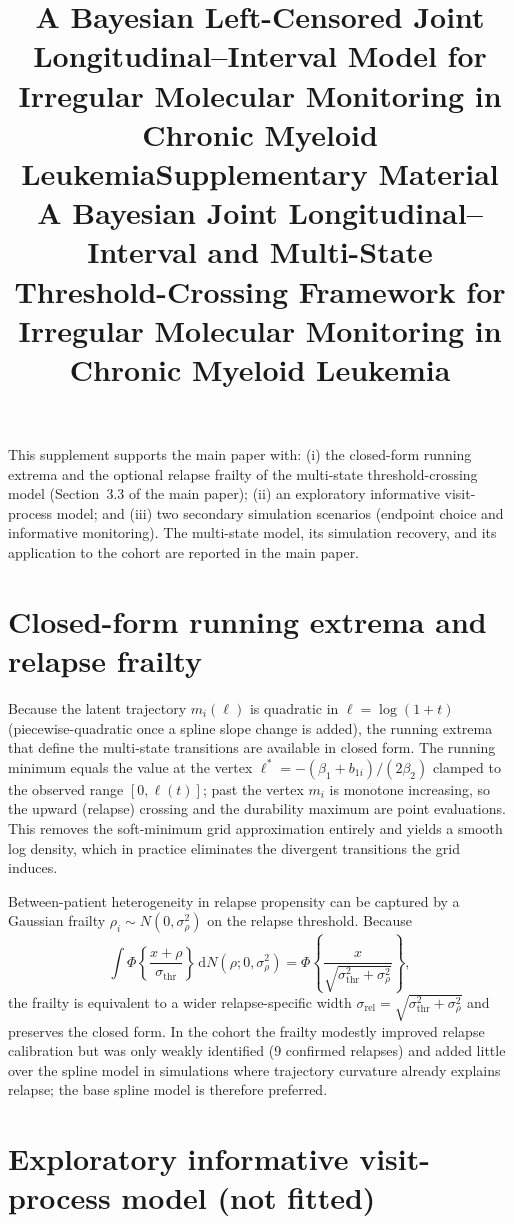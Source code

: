 \documentclass[11pt]{article}
\title{A Bayesian Left-Censored Joint Longitudinal--Interval Model for
Irregular Molecular Monitoring in Chronic Myeloid Leukemia}
\author{}     %
\date{}
\title{Supplementary Material\\[2pt]
\large A Bayesian Joint Longitudinal--Interval and Multi-State
Threshold-Crossing Framework for Irregular Molecular Monitoring in Chronic
Myeloid Leukemia}
\author{}
\date{}
\begin{document}
\maketitle

\noindent This supplement supports the main paper with: (i) the closed-form
running extrema and the optional relapse frailty of the multi-state
threshold-crossing model (Section~3.3 of the main paper); (ii) an exploratory
informative visit-process model; and (iii) two secondary simulation scenarios
(endpoint choice and informative monitoring). The multi-state model, its
simulation recovery, and its application to the cohort are reported in the main
paper.

\section{Closed-form running extrema and relapse frailty}
\label{sec:s-frailty}

Because the latent trajectory $m_i(\ell)$ is quadratic in $\ell=\log(1+t)$
(piecewise-quadratic once a spline slope change is added), the running extrema
that define the multi-state transitions are available in closed form. The
running minimum equals the value at the vertex
$\ell^\ast=-(\beta_1+b_{1i})/(2\beta_2)$ clamped to the observed range
$[0,\ell(t)]$; past the vertex $m_i$ is monotone increasing, so the upward
(relapse) crossing and the durability maximum are point evaluations. This
removes the soft-minimum grid approximation entirely and yields a smooth log
density, which in practice eliminates the divergent transitions the grid
induces.

Between-patient heterogeneity in relapse propensity can be captured by a
Gaussian frailty $\rho_i\sim N(0,\sigma_\rho^2)$ on the relapse threshold.
Because
\[
\int\Phi\!\left\{\frac{x+\rho}{\sigma_{\mathrm{thr}}}\right\}\,\mathrm dN(\rho;0,\sigma_\rho^2)
=\Phi\!\left\{\frac{x}{\sqrt{\sigma_{\mathrm{thr}}^2+\sigma_\rho^2}}\right\},
\]
the frailty is equivalent to a wider relapse-specific width
$\sigma_{\mathrm{rel}}=\sqrt{\sigma_{\mathrm{thr}}^2+\sigma_\rho^2}$ and
preserves the closed form. In the cohort the frailty modestly improved relapse
calibration but was only weakly identified (9 confirmed relapses) and added
little over the spline model in simulations where trajectory curvature already
explains relapse; the base spline model is therefore preferred.

\section{Exploratory informative visit-process model (not fitted)}
\label{sec:s-visit}
\end{document}
